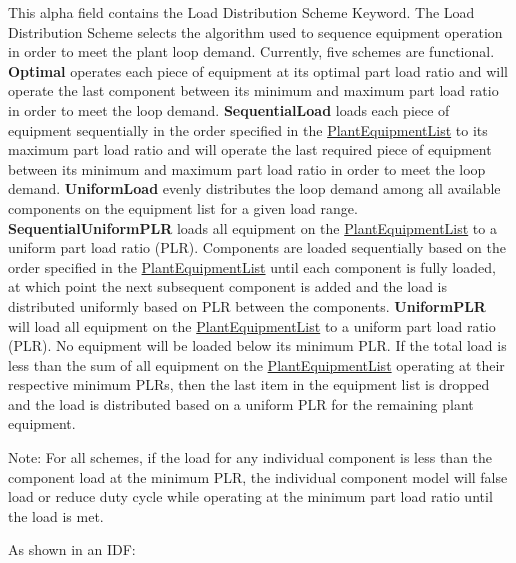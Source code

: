 This alpha field contains the Load Distribution Scheme Keyword. The Load Distribution Scheme selects the algorithm used to sequence equipment operation in order to meet the plant loop demand. Currently, five schemes are functional. \textbf{Optimal} operates each piece of equipment at its optimal part load ratio and will operate the last component between its minimum and maximum part load ratio in order to meet the loop demand. \textbf{SequentialLoad} loads each piece of equipment sequentially in the order specified in the \hyperref[plantequipmentlist]{PlantEquipmentList} to its maximum part load ratio and will operate the last required piece of equipment between its minimum and maximum part load ratio in order to meet the loop demand. \textbf{UniformLoad} evenly distributes the loop demand among all available components on the equipment list for a given load range. \textbf{SequentialUniformPLR} loads all equipment on the \hyperref[plantequipmentlist]{PlantEquipmentList} to a uniform part load ratio (PLR). Components are loaded sequentially based on the order specified in the \hyperref[plantequipmentlist]{PlantEquipmentList} until each component is fully loaded, at which point the next subsequent component is added and the load is distributed uniformly based on PLR between the components. \textbf{UniformPLR} will load all equipment on the \hyperref[plantequipmentlist]{PlantEquipmentList} to a uniform part load ratio (PLR). No equipment will be loaded below its minimum PLR. If the total load is less than the sum of all equipment on the \hyperref[plantequipmentlist]{PlantEquipmentList} operating at their respective minimum PLRs, then the last item in the equipment list is dropped and the load is distributed based on a uniform PLR for the remaining plant equipment.

Note: For all schemes, if the load for any individual component is less than the component load at the minimum PLR, the individual component model will false load or reduce duty cycle while operating at the minimum part load ratio until the load is met.

As shown in an IDF:

